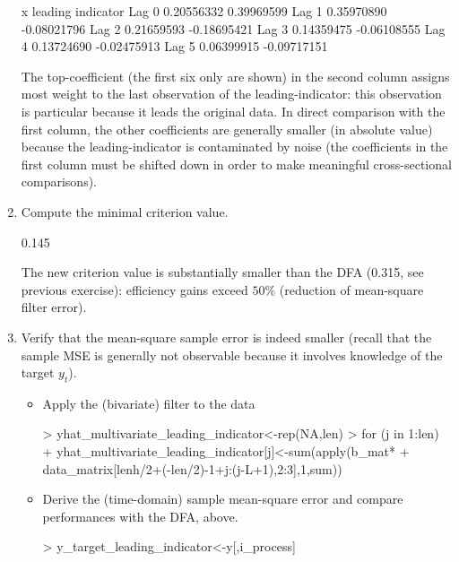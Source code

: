 \documentclass[a4paper]{book}
\begin{document}
\begin{enumerate}
\begin{Schunk}
\begin{Soutput}
               x leading indicator
Lag 0 0.20556332        0.39969599
Lag 1 0.35970890       -0.08021796
Lag 2 0.21659593       -0.18695421
Lag 3 0.14359475       -0.06108555
Lag 4 0.13724690       -0.02475913
Lag 5 0.06399915       -0.09717151
\end{Soutput}
\end{Schunk}
The top-coefficient (the first six only are shown) in the second column assigns most weight to the last observation of the leading-indicator: this observation is particular because it leads the original data. In direct comparison with the first column, the other coefficients are generally smaller (in absolute value) because the leading-indicator is contaminated by noise (the coefficients in the first column must be shifted down in order to make meaningful cross-sectional comparisons).  
\item Compute the minimal criterion value.
\begin{Schunk}
\begin{Soutput}
[1] 0.145
\end{Soutput}
\end{Schunk}
The new criterion value is substantially smaller than the DFA (0.315, see previous exercise): efficiency gains exceed $50\%$ (reduction of mean-square filter error).
\item  Verify that the mean-square sample error is indeed smaller (recall that the sample MSE is generally not observable because it involves knowledge of the target $y_t$).
\begin{itemize}
\item Apply the (bivariate) filter to the data
\begin{Schunk}
\begin{Sinput}
> yhat_multivariate_leading_indicator<-rep(NA,len)
> for (j in 1:len)
+   yhat_multivariate_leading_indicator[j]<-sum(apply(b_mat*
+                   data_matrix[lenh/2+(-len/2)-1+j:(j-L+1),2:3],1,sum))
\end{Sinput}
\end{Schunk}
\item Derive the (time-domain) sample mean-square error and compare performances with the DFA, above.
\begin{Schunk}
\begin{Sinput}
> y_target_leading_indicator<-y[,i_process]

\end{Sinput}
\end{Schunk}
\end{itemize}
\end{enumerate}
\end{document}
